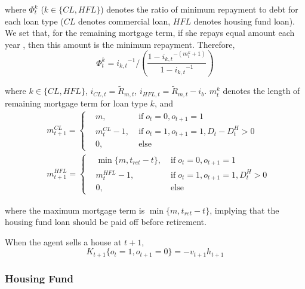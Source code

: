 \documentclass[
  12pt,
]{article}
\begin{document}
where \(\Phi^k_t\) (\(k\in\{CL,HFL\}\)) denotes the ratio of minimum
repayment to debt for each loan type (\(CL\) denotes commercial loan,
\(HFL\) denotes housing fund loan). We set that, for the remaining
mortgage term, if she repays equal amount each year , then this amount
is the minimum repayment. Therefore, \begin{equation}
\Phi^k_t = {i_{k,t}}^{-1}/\left(\frac{1-{i_{k,t}}^{-(m^k_t+1)}}{1-{i_{k,t}}^{-1}}\right)
\end{equation}

where \(k\in\{CL,HFL\}\), \(i_{CL,t} = \tilde{R}_{m,t}\),
\(i_{HFL,t} = \tilde{R}_{m,t} - i_b\). \(m^k_t\) denotes the length of
remaining mortgage term for loan type \(k\), and \begin{equation}
\begin{aligned}
& m^{CL}_{t+1} = \left\{
\begin{aligned}
& m, & \; \text{if} \; o_t = 0,o_{t+1} = 1 \\
& m^{CL}_t - 1, & \; \text{if} \;o_t=1, o_{t+1}=1, D_t-D^H_t>0 \\
& 0, & \; \text{else}
\end{aligned}\right. \\
& m^{HFL}_{t+1} = \left\{
\begin{aligned}
& \min\{m,t_{ret}-t\}, & \; \text{if} \; o_t = 0,o_{t+1} = 1 \\
& m^{HFL}_t - 1, & \; \text{if} \;o_t=1, o_{t+1}=1, D^H_t>0 \\
& 0, & \; \text{else}
\end{aligned}\right.
\end{aligned}
\end{equation}

where the maximum mortgage term is \(\min\{m,t_{ret}-t\}\), implying
that the housing fund loan should be paid off before retirement.

When the agent sells a house at \(t+1\), \begin{equation}
K_{t+1}\{o_t=1,o_{t+1}=0\} = -v_{t+1}h_{t+1}
\end{equation}

\hypertarget{housing-fund}{%
\subsubsection{Housing Fund}\label{housing-fund}}
\end{document}
